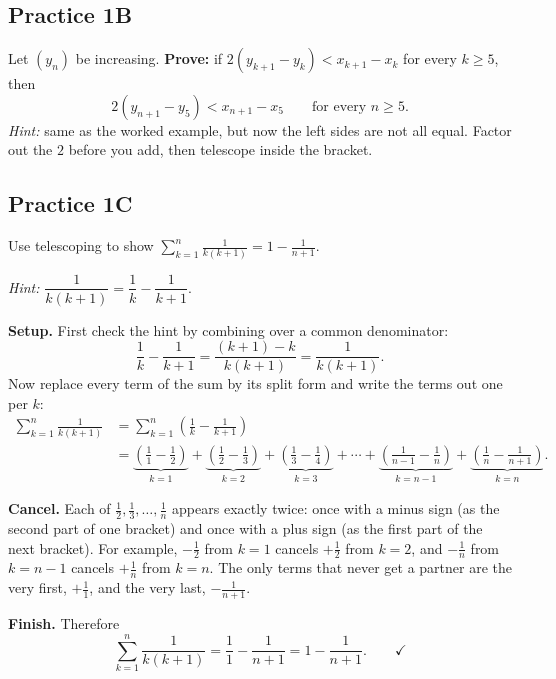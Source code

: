\documentclass[11pt]{article}
\begin{document}
\vspace{2.5cm}

\subsection*{Practice 1B}
Let $(y_n)$ be increasing. \textbf{Prove:} if
$2(y_{k+1}-y_k) < x_{k+1}-x_k$ for every $k\ge 5$, then
\[
  2(y_{n+1}-y_5) < x_{n+1}-x_5 \qquad\text{for every } n\ge 5 .
\]
\emph{Hint:} same as the worked example, but now the left sides are not all
equal. Factor out the $2$ before you add, then telescope inside the bracket.

\vspace{3cm}

\subsection*{Practice 1C}
Use telescoping to show
$\displaystyle\sum_{k=1}^{n}\frac{1}{k(k+1)} = 1-\frac{1}{n+1}$.

\emph{Hint:} $\dfrac{1}{k(k+1)} = \dfrac1k - \dfrac1{k+1}$.

\textbf{Setup.} First check the hint by combining over a common denominator:
\[
  \frac1k - \frac1{k+1} = \frac{(k+1)-k}{k(k+1)} = \frac{1}{k(k+1)} .
\]
Now replace every term of the sum by its split form and write the terms out
one per $k$:
\[
\begin{aligned}
  \sum_{k=1}^{n}\frac{1}{k(k+1)}
  &= \sum_{k=1}^{n}\left(\frac1k - \frac1{k+1}\right)\\[4pt]
  &= \underbrace{\left(\frac11 - \frac12\right)}_{k=1}
   + \underbrace{\left(\frac12 - \frac13\right)}_{k=2}
   + \underbrace{\left(\frac13 - \frac14\right)}_{k=3}
   + \cdots
   + \underbrace{\left(\frac1{n-1} - \frac1n\right)}_{k=n-1}
   + \underbrace{\left(\frac1n - \frac1{n+1}\right)}_{k=n} .
\end{aligned}
\]

\textbf{Cancel.} Each of $\frac12, \frac13, \dots, \frac1n$ appears exactly
twice: once with a minus sign (as the second part of one bracket) and once
with a plus sign (as the first part of the next bracket). For example,
$-\frac12$ from $k=1$ cancels $+\frac12$ from $k=2$, and $-\frac1n$ from
$k=n-1$ cancels $+\frac1n$ from $k=n$. The only terms that never get a
partner are the very first, $+\frac11$, and the very last, $-\frac1{n+1}$.

\textbf{Finish.} Therefore
\[
  \sum_{k=1}^{n}\frac{1}{k(k+1)} = \frac11 - \frac1{n+1} = 1 - \frac{1}{n+1}.
  \qquad\checkmark
\]
\end{document}
